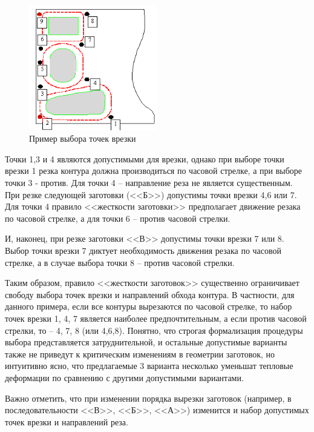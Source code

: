 \documentclass[11pt,twoside]{report}
\begin{document}
\begin{figure}
  \begin{center}
  \includegraphics[width=0.5\textwidth]{part-hardness.png}
  \caption{Пример выбора точек врезки}
  \label{part-hardness}
  \end{center}
\end{figure}

Точки 1,3 и 4 являются допустимыми для врезки,
однако при выборе точки врезки 1 резка контура
должна производиться по часовой стрелке,
а при выборе точки 3 - против.
Для точки 4 – направление реза не является существенным.
При резке следующей заготовки (<<Б>>)
допустимы точки врезки 4,6 или 7.
Для точки 4 правило <<жесткости заготовки>>
предполагает движение резака по часовой стрелке,
а для точки 6 – против часовой стрелки.

И, наконец, при резке заготовки <<В>>
допустимы точки врезки 7 или 8.
Выбор точки врезки 7 диктует необходимость
движения резака по часовой стрелке,
а в случае выбора точки 8 – против часовой стрелки.

Таким образом, правило <<жесткости заготовок>>
существенно ограничивает свободу выбора точек
врезки и направлений обхода контура.
В частности, для данного примера,
если все контуры вырезаются по часовой стрелке,
то набор точек врезки 1, 4, 7
является наиболее предпочтительным,
а если против часовой стрелки, то – 4, 7, 8
(или 4,6,8).
Понятно, что строгая формализация процедуры
выбора представляется затруднительной,
и остальные допустимые варианты также не приведут
к критическим изменениям в геометрии заготовок,
но интуитивно ясно, что предлагаемые 3 варианта
несколько уменьшат тепловые деформации по сравнению
с другими допустимыми вариантами.

Важно отметить,
что при изменении порядка вырезки заготовок
(например, в последовательности <<В>>, <<Б>>, <<А>>)
изменится и набор допустимых точек врезки и направлений реза.
\end{document}
